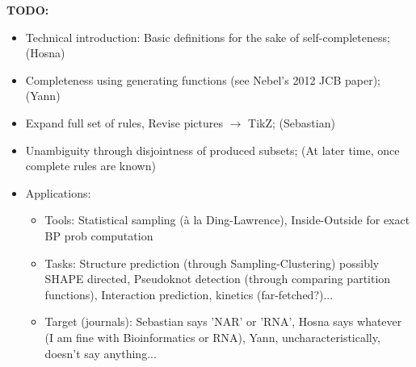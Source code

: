 \documentclass[11pt]{article} %
\begin{document}
\newpage
{\bf TODO:}
\begin{itemize}
  \item Technical introduction: Basic definitions for the sake of self-completeness; (Hosna)
  \item Completeness using generating functions (see Nebel's 2012 JCB paper); (Yann)
  \item Expand full set of rules, Revise pictures $\to$ TikZ; (Sebastian)
  \item Unambiguity through disjointness of produced subsets; (At later time, once complete rules are known)
  \item Applications: 
  \begin{itemize}
    \item Tools: Statistical sampling (à la Ding-Lawrence), Inside-Outside for exact BP prob computation
    \item Tasks: Structure prediction (through Sampling-Clustering) possibly SHAPE directed, Pseudoknot detection (through comparing partition functions), Interaction prediction, kinetics (far-fetched?)...
    \item Target (journals): Sebastian says 'NAR' or 'RNA', Hosna says whatever (I am fine with Bioinformatics or RNA), Yann, uncharacteristically, doesn't say anything...
  \end{itemize}
\end{itemize}
\end{document}
